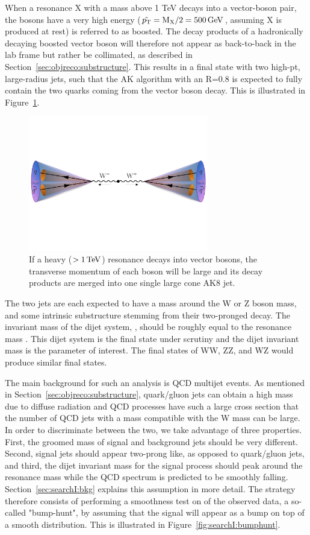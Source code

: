 When a resonance X with a mass above 1 TeV decays into a vector-boson pair, the bosons have a very high energy ($\tilde{p_{\mathrm{T}}}=\text{M}_{\text{X}}/2=500 \,\text{Ge\hspace{-.08em}V}$, assuming X is produced at rest) is referred to as boosted. The decay products of a hadronically decaying boosted vector boson will therefore not appear as back-to-back in the lab frame but rather be collimated, as described in Section~\ref{sec:objreco:substructure}. This results in a final state with two high-pt, large-radius jets, such that the AK algorithm with an R=0.8 is expected to fully contain the two quarks coming from the vector boson decay. This is illustrated in Figure~\ref{fig:searchI:merged}.
\begin{figure}[h!] 
    \centering
    \includegraphics[width=0.70\textwidth]{figures/event_reconstruction/WWqqqq_merged_small.pdf}
    \caption{If a heavy ($>1 \,\text{Te\hspace{-.08em}V}$) resonance decays into vector bosons, the transverse momentum of each boson will be large and its decay products are merged into one single large cone AK8 jet.}
    \label{fig:searchI:merged}
\end{figure}
The two jets are each expected to have a mass around the W or Z boson mass, and some intrinsic substructure stemming from their two-pronged decay. The invariant mass of the dijet system, \mjj, should be roughly equal to the resonance mass \mX. This dijet system is the final state under scrutiny and the dijet invariant mass is the parameter of interest. The final states of WW, ZZ, and WZ would produce similar final states. \par
The main background for such an analysis is QCD multijet events. As mentioned in Section~\ref{sec:objreco:substructure}, quark/gluon jets can obtain a high mass due to diffuse radiation and QCD processes have such a large cross section that the number of QCD jets with a mass compatible with the W mass can be large. In order to discriminate between the two, we take advantage of three properties. First, the groomed mass of signal and background jets should be very different. Second, signal jets should appear two-prong like, as opposed to quark/gluon jets, and third, the dijet invariant mass for the signal process should peak around the resonance mass while the QCD spectrum is predicted to be smoothly falling. Section~\ref{sec:searchI:bkg} explains this assumption in more detail. The strategy therefore consists of performing a smoothness test on \mjj of the observed data, a so-called "bump-hunt", by assuming that the signal will appear as a bump on top of a smooth distribution. This is illustrated in Figure~\ref{fig:searchI:bumphunt}.
